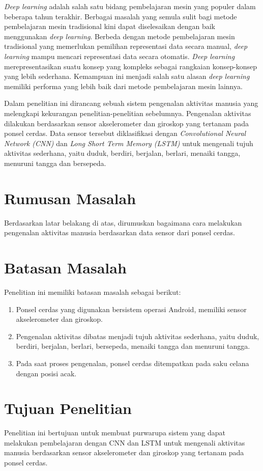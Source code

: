 \textit{Deep learning} adalah salah satu bidang pembelajaran mesin yang populer dalam beberapa tahun terakhir. Berbagai masalah yang semula sulit bagi metode pembelajaran mesin tradisional kini dapat diselesaikan dengan baik menggunakan \textit{deep learning}. Berbeda dengan metode pembelajaran mesin tradisional yang memerlukan pemilihan representasi data secara manual, \textit{deep learning} mampu mencari representasi data secara otomatis. \textit{Deep learning} merepresentasikan suatu konsep yang kompleks sebagai rangkaian konsep-konsep yang lebih sederhana. Kemampuan ini menjadi salah satu alasan \textit{deep learning} memiliki performa yang lebih baik dari metode pembelajaran mesin lainnya.

Dalam penelitian ini dirancang sebuah sistem pengenalan aktivitas manusia yang melengkapi kekurangan penelitian-penelitian sebelumnya. Pengenalan aktivitas dilakukan berdasarkan sensor akselerometer dan giroskop yang tertanam pada ponsel cerdas. Data sensor tersebut diklasifikasi dengan \textit{Convolutional Neural Network (CNN)} dan \textit{Long Short Term Memory (LSTM)} untuk mengenali tujuh aktivitas sederhana, yaitu duduk, berdiri, berjalan, berlari, menaiki tangga, menuruni tangga dan bersepeda.

\section{Rumusan Masalah}
Berdasarkan latar belakang di atas, dirumuskan bagaimana cara melakukan pengenalan aktivitas manusia berdasarkan data sensor dari ponsel cerdas.

\section{Batasan Masalah}
Penelitian ini memiliki batasan masalah sebagai berikut:

\begin{enumerate}
    \item Ponsel cerdas yang digunakan bersistem operasi Android, memiliki sensor akselerometer dan giroskop.
    \item Pengenalan aktivitas dibatas menjadi tujuh aktivitas sederhana, yaitu duduk, berdiri, berjalan, berlari, bersepeda, menaiki tangga dan menuruni tangga.
    \item Pada saat proses pengenalan, ponsel cerdas ditempatkan pada saku celana dengan posisi acak.
\end{enumerate}

\section{Tujuan Penelitian}
Penelitian ini bertujuan untuk membuat purwarupa sistem yang dapat melakukan pembelajaran dengan CNN dan LSTM untuk mengenali aktivitas manusia berdasarkan sensor akselerometer dan giroskop yang tertanam pada ponsel cerdas.

